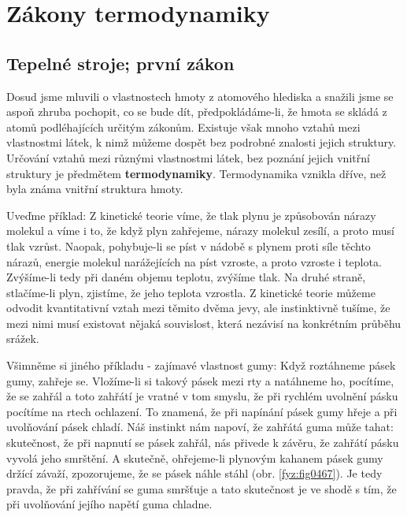 \setchaptertoc
\chapter{Zákony termodynamiky}\label{fyz:IchapXLIV}

  \section{Tepelné stroje; první zákon}\label{fyz:IchapXLIVsecI}
    Dosud jsme mluvili o vlastnostech hmoty z atomového hlediska a snažili jsme se aspoň zhruba
    pochopit, co se bude dít, předpokládáme-li, že hmota se skládá z atomů podléhajících určitým
    zákonům. Existuje však mnoho vztahů mezi vlastnostmi látek, k nimž můžeme dospět bez podrobné
    znalosti jejich struktury. Určování vztahů mezi různými vlastnostmi látek, bez poznání jejich
    vnitřní struktury je předmětem \textbf{termodynamiky}. Termodynamika vznikla dříve, než byla
    známa vnitřní struktura hmoty.
    
    Uveďme příklad: Z kinetické teorie víme, že tlak plynu je způsobován nárazy molekul a víme i to,
    že když plyn zahřejeme, nárazy molekul zesílí, a proto musí tlak vzrůst. Naopak, pohybuje-li se
    píst v nádobě s plynem proti síle těchto nárazů, energie molekul narážejících na píst vzroste, a
    proto vzroste i teplota. Zvýšíme-li tedy při daném objemu teplotu, zvýšíme tlak. Na druhé
    straně, stlačíme-li plyn, zjistíme, že jeho teplota vzrostla. Z kinetické teorie můžeme odvodit
    kvantitativní vztah mezi těmito dvěma jevy, ale instinktivně tušíme, že mezi nimi musí existovat
    nějaká souvislost, která nezávisí na konkrétním průběhu srážek. 
    
    Všimněme si jiného příkladu - zajímavé vlastnost gumy: Když roztáhneme pásek gumy, zahřeje se.
    Vložíme-li si takový pásek mezi rty a natáhneme ho, pocítíme, že se zahřál a toto zahřátí je
    vratné v tom smyslu, že při rychlém uvolnění pásku pocítíme na rtech ochlazení. To znamená, že
    při napínání pásek gumy hřeje a při uvolňování pásek chladí. Náš instinkt nám napoví, že zahřátá
    guma může tahat: skutečnost, že při napnutí se pásek zahřál, nás přivede k závěru, že zahřátí
    pásku vyvolá jeho smrštění. A skutečně, ohřejeme-li plynovým kahanem pásek gumy držící závaží,
    zpozorujeme, že se pásek náhle stáhl (obr. \ref{fyz:fig0467}). Je tedy pravda, že při zahřívání
    se guma smršťuje a tato skutečnost je ve shodě s tím, že při uvolňování jejího napětí guma
    chladne.

